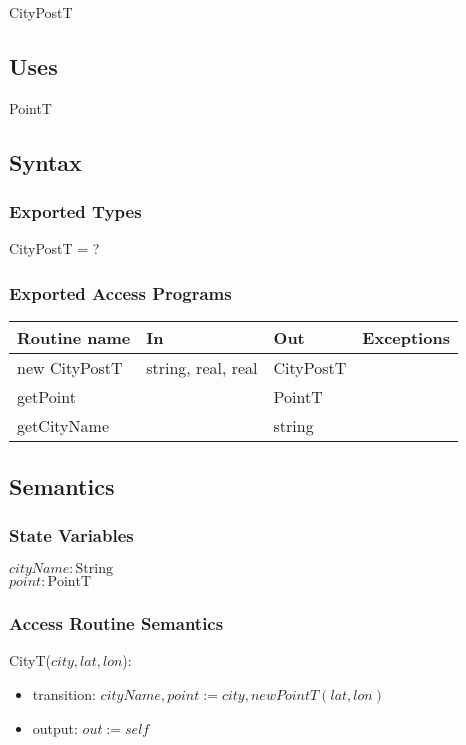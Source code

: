 \documentclass[12pt]{article}
\begin{document}
CityPostT

\subsection* {Uses}

PointT

\subsection* {Syntax}

\subsubsection* {Exported Types}

CityPostT = ?


\subsubsection* {Exported Access Programs}

\begin{tabular}{| l | l | l | p{6cm} |}
\hline
\textbf{Routine name} & \textbf{In} & \textbf{Out} & \textbf{Exceptions}\\
\hline
new CityPostT & string, real, real & CityPostT & \\
\hline
getPoint & ~ & PointT & \\
\hline
getCityName &~ & string & \\
\hline
\end{tabular}

\subsection* {Semantics}

\subsubsection* {State Variables}

$\mathit{cityName}: \text{String}$\\
$\mathit{point}: \text{PointT}$\\

\subsubsection* {Access Routine Semantics}

CityT($city, lat, lon$):
\begin{itemize}
\item transition: $cityName, point := city, new PointT(lat,lon)$ 

\item output: $\mathit{out} := \mathit{self}$
\end{itemize}
\end{document}

